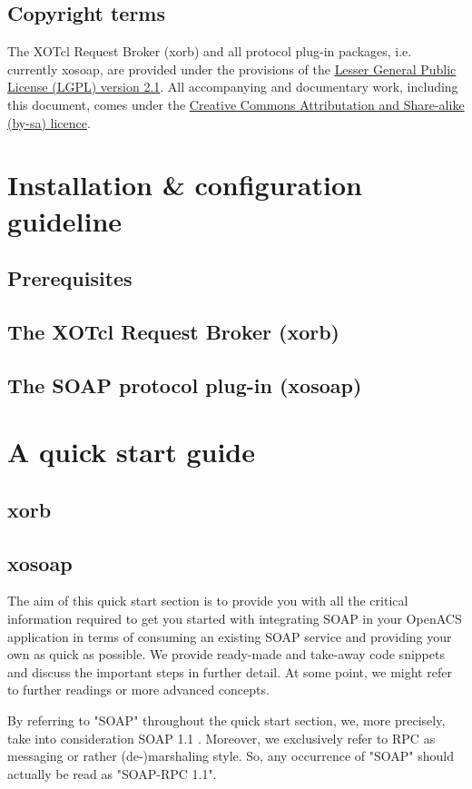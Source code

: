\subsection{Copyright terms}
The XOTcl Request Broker (xorb) and all protocol plug-in packages, i.e. currently xosoap, are provided 
under the provisions of the \href{http://creativecommons.org/licenses/LGPL/2.1/}{Lesser General Public 
License (LGPL) version 2.1}. All accompanying and documentary work, including this document, comes 
under the \href{http://creativecommons.org/licenses/by-sa/2.0/at/}{Creative Commons Attributation and 
Share-alike (by-sa) licence}.

     \section{Installation \& configuration guideline}
     	\subsection{Prerequisites}
	\subsection{The XOTcl Request Broker (xorb)}
 
	\subsection{The SOAP protocol plug-in (xosoap)}
  \section{A quick start guide}\label{sec:quickstart}
  \subsection{xorb}\label{sec:quickstart:xorb}
  \subsection{xosoap}\label{sec:quickstart:xosoap}
  The aim of this quick start section is to provide you with all the critical information required to get you 
started with integrating SOAP in your OpenACS application in terms of consuming an existing SOAP 
service and providing your own as quick as possible. We provide ready-made and take-away code 
snippets and discuss the important steps in further detail. At some point, we might refer to further 
readings or more advanced concepts. 
\begin{hints}
\item By referring to "SOAP" throughout the quick start section, we, more precisely, take into consideration SOAP 1.1 \cite{w3c:2000}. Moreover, we exclusively refer to RPC as messaging or rather (de-)marshaling style. So, any occurrence of "SOAP" should actually be read as "SOAP-RPC 1.1".
\end{hints}
